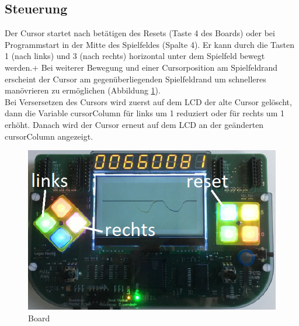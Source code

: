     \subsection{Steuerung}
        Der Cursor startet nach betätigen des Resets (Taste 4 des Boards) oder bei Programmstart in der Mitte des Spielfeldes (Spalte 4).
        Er kann durch die Tasten 1 (nach links) und 3 (nach rechts) horizontal unter dem Spielfeld bewegt werden.+
        Bei weiterer Bewegung und einer Cursorposition am Spielfeldrand erscheint der Cursor am gegenüberliegenden Spielfeldrand um schnelleres manövrieren zu ermöglichen (Abbildung \ref{fig:board}).
        \\
        Bei Versersetzen des Cursors wird zuerst auf dem LCD der alte Cursor gelöscht,
        dann die Variable cursorColumn für links um 1 reduziert oder für rechts um 1 erhöht.
        Danach wird der Cursor erneut auf dem LCD an der geänderten cursorColumn angezeigt.

        \begin{figure}[H]
            \centering
            \includegraphics[scale=0.5]{img/board.png}    
            \caption{Board}
            \label{fig:board}
        \end{figure}